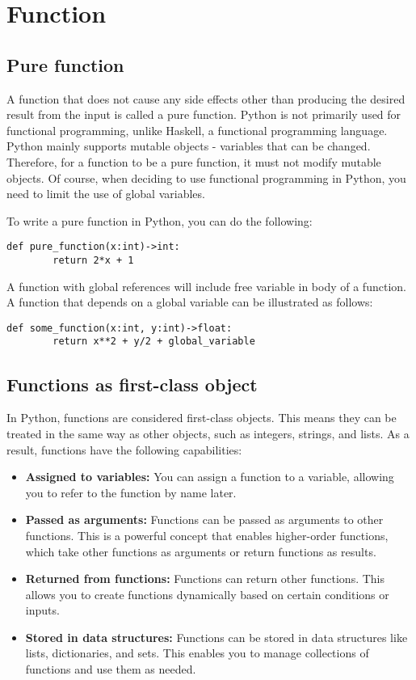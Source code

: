 \section{Function}
\subsection{Pure function}
A function that does not cause any side effects other than producing the desired result from the input is called a pure function. Python is not primarily used for functional programming, unlike Haskell, a functional programming language. Python mainly supports mutable objects - variables that can be changed. Therefore, for a function to be a pure function, it must not modify mutable objects. Of course, when deciding to use functional programming in Python, you need to limit the use of global variables.

To write a pure function in Python, you can do the following:
\begin{lstlisting}[style=mystyle]
    def pure_function(x:int)->int:
        return 2*x + 1
\end{lstlisting}
A function with global references will include free variable in body of a function. A function that depends on a global variable can be illustrated as follows:
\begin{lstlisting}[style=mystyle]
    def some_function(x:int, y:int)->float:
        return x**2 + y/2 + global_variable
\end{lstlisting}
\subsection{Functions as first-class object}
In Python, functions are considered first-class objects. This means they can be treated in the same way as other objects, such as integers, strings, and lists. As a result, functions have the following capabilities:

\begin{itemize}
  \item \textbf{Assigned to variables:} You can assign a function to a variable, allowing you to refer to the function by name later.
  \item \textbf{Passed as arguments:} Functions can be passed as arguments to other functions. This is a powerful concept that enables higher-order functions, which take other functions as arguments or return functions as results.
  \item \textbf{Returned from functions:} Functions can return other functions. This allows you to create functions dynamically based on certain conditions or inputs.
  \item \textbf{Stored in data structures:} Functions can be stored in data structures like lists, dictionaries, and sets. This enables you to manage collections of functions and use them as needed.
\end{itemize}

